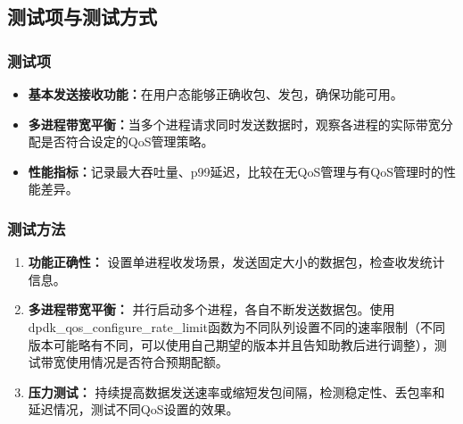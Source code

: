 \subsection{测试项与测试方式}
\subsubsection{测试项}
\begin{itemize}
    \item \textbf{基本发送接收功能：}在用户态能够正确收包、发包，确保功能可用。
    \item \textbf{多进程带宽平衡：}当多个进程请求同时发送数据时，观察各进程的实际带宽分配是否符合设定的QoS管理策略。
    \item \textbf{性能指标：}记录最大吞吐量、p99延迟，比较在无QoS管理与有QoS管理时的性能差异。
\end{itemize}

\subsubsection{测试方法}
\begin{enumerate}
    \item \textbf{功能正确性：}  设置单进程收发场景，发送固定大小的数据包，检查收发统计信息。
    \item \textbf{多进程带宽平衡：}  并行启动多个进程，各自不断发送数据包。使用dpdk\_qos\_configure\_rate\_limit函数为不同队列设置不同的速率限制（不同版本可能略有不同，可以使用自己期望的版本并且告知助教后进行调整），测试带宽使用情况是否符合预期配额。
    \item \textbf{压力测试：} 持续提高数据发送速率或缩短发包间隔，检测稳定性、丢包率和延迟情况，测试不同QoS设置的效果。
\end{enumerate}

